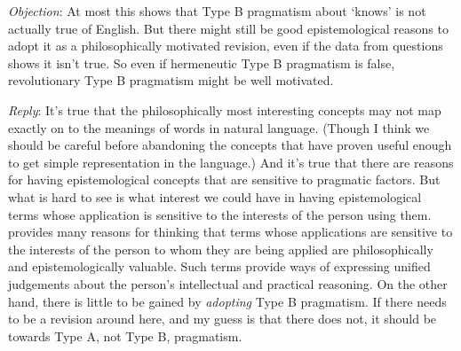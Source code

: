 \bigskip \noindent \textit{Objection}: At most this shows that Type B pragmatism about `knows' is not actually true of English. But there might still be good epistemological reasons to adopt it as a philosophically motivated revision, even if the data from questions shows it isn't true. So even if hermeneutic Type B pragmatism is false, revolutionary Type B pragmatism might be well motivated.

\medskip \noindent \textit{Reply}: It's true that the philosophically most interesting concepts may not map exactly on to the meanings of words in natural language. (Though I think we should be careful before abandoning the concepts that have proven useful enough to get simple representation in the language.) And it's true that there are reasons for having epistemological concepts that are sensitive to pragmatic factors. But what is hard to see is what interest we could have in having epistemological terms whose application is sensitive to the interests of the person using them. \citet{Hawthorne2004} provides many reasons for thinking that terms whose applications are sensitive to the interests of the person to whom they are being applied are philosophically and epistemologically valuable. Such terms provide ways of expressing unified judgements about the person's intellectual and practical reasoning. On the other hand, there is little to be gained by \textit{adopting} Type B pragmatism. If there needs to be a revision around here, and my guess is that there does not, it should be towards Type A, not Type B, pragmatism.
